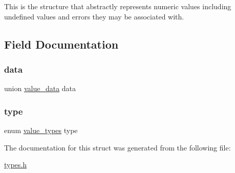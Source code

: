 This is the structure that abstractly represents numeric values including undefined values and errors they may be associated with. 

\subsection{Field Documentation}
\mbox{\label{structvalue_a7a505de18bdf859cc9246069c70c18b5}} 
\subsubsection{\texorpdfstring{data}{data}}
{\footnotesize\ttfamily union \hyperlink{unionvalue__data}{value\+\_\+data} data}

\mbox{\label{structvalue_a51293d8a9946f28f389010bf83820015}} 
\subsubsection{\texorpdfstring{type}{type}}
{\footnotesize\ttfamily enum \hyperlink{types_8h_a2763ddd86ab6e5f5f4c34c0561d4cd39}{value\+\_\+types} type}



The documentation for this struct was generated from the following file\+:\begin{DoxyCompactItemize}
\item 
\hyperlink{types_8h}{types.\+h}\end{DoxyCompactItemize}
